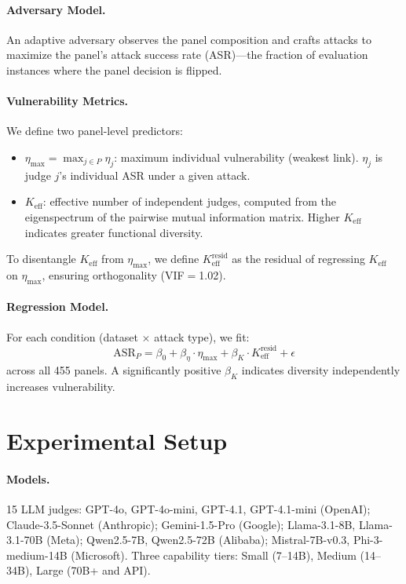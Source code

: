 \documentclass[11pt,a4paper]{article}
\newcommand{\keff}{K_{\text{eff}}}
\newcommand{\etamax}{\eta_{\text{max}}}
\newcommand{\keffresid}{K_{\text{eff}}^{\text{resid}}}
\begin{document}
\paragraph{Adversary Model.} An adaptive adversary observes the panel composition and crafts attacks to maximize the panel's attack success rate (ASR)---the fraction of evaluation instances where the panel decision is flipped.

\paragraph{Vulnerability Metrics.} We define two panel-level predictors:
\begin{itemize}[nosep,leftmargin=*]
\item $\etamax = \max_{j \in P} \eta_j$: maximum individual vulnerability (weakest link). $\eta_j$ is judge $j$'s individual ASR under a given attack.
\item $\keff$: effective number of independent judges, computed from the eigenspectrum of the pairwise mutual information matrix. Higher $\keff$ indicates greater functional diversity.
\end{itemize}

To disentangle $\keff$ from $\etamax$, we define $\keffresid$ as the residual of regressing $\keff$ on $\etamax$, ensuring orthogonality (VIF$=$1.02).

\paragraph{Regression Model.} For each condition (dataset $\times$ attack type), we fit:
\begin{equation}
\text{ASR}_P = \beta_0 + \beta_\eta \cdot \etamax + \beta_K \cdot \keffresid + \epsilon
\end{equation}
across all 455 panels. A significantly positive $\beta_K$ indicates diversity independently increases vulnerability.

\section{Experimental Setup}

\paragraph{Models.} 15 LLM judges: GPT-4o, GPT-4o-mini, GPT-4.1, GPT-4.1-mini (OpenAI); Claude-3.5-Sonnet (Anthropic); Gemini-1.5-Pro (Google); Llama-3.1-8B, Llama-3.1-70B (Meta); Qwen2.5-7B, Qwen2.5-72B (Alibaba); Mistral-7B-v0.3, Phi-3-medium-14B (Microsoft). Three capability tiers: Small (7--14B), Medium (14--34B), Large (70B+ and API).
\end{document}
